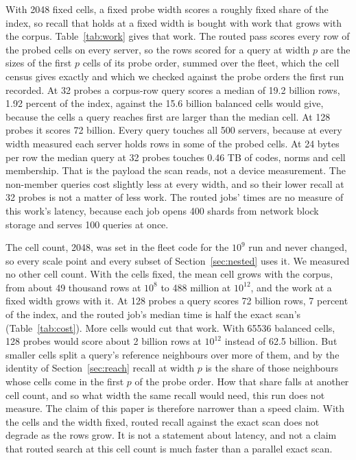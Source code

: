 \documentclass[sigconf, nonacm]{acmart}
\begin{document}
With 2048 fixed cells, a fixed probe width scores a roughly fixed share of the index, so recall
that holds at a fixed width is bought with work that grows with the corpus. Table~\ref{tab:work}
gives that work. The routed pass scores every row of the probed cells on every server, so the rows
scored for a query at width $p$ are the sizes of the first $p$ cells of its probe order, summed
over the fleet, which the cell census gives exactly and which we checked against the probe orders
the first run recorded. At 32 probes a corpus-row query scores a median of 19.2 billion rows, 1.92
percent of the index, against the 15.6 billion balanced cells would give, because the cells a query
reaches first are larger than the median cell. At 128 probes it scores 72 billion. Every query
touches all 500 servers, because at every width measured each server holds rows in some of the
probed cells. At 24 bytes per row the
median query at 32 probes touches 0.46 TB of codes, norms and cell membership. That is the payload
the scan reads, not a device measurement. The non-member queries cost slightly less at every
width, and so their lower recall at 32 probes is not a matter of less work. The routed jobs'
times are no measure of this work's latency, because each job opens 400 shards from network block
storage and serves 100 queries at once.

The cell count, 2048, was set in the fleet code for the $10^{9}$ run and never changed, so every
scale point and every subset of Section~\ref{sec:nested} uses it. We measured no other cell count. With the
cells fixed, the mean cell grows with the corpus, from about 49 thousand rows at $10^{8}$ to 488
million at $10^{12}$, and the work at a fixed width grows with it. At 128 probes a query scores 72
billion rows, 7 percent of the index, and the routed job's median time is half the exact scan's
(Table~\ref{tab:cost}). More cells would cut that work. With 65536 balanced cells, 128 probes would
score about 2 billion rows at $10^{12}$ instead of 62.5 billion. But smaller cells split a query's
reference neighbours over more of them, and by the identity of Section~\ref{sec:reach} recall at
width $p$ is the share of those neighbours whose cells come in the first $p$ of the probe order. How
that share falls at another cell count, and so what width the same recall would need, this run does
not measure. The claim of this paper is therefore narrower than a speed claim. With the cells and
the width fixed, routed recall against the exact scan does not degrade as the rows grow. It is not a
statement about latency, and not a claim that routed search at this cell count is much faster than
a parallel exact scan.
\end{document}

